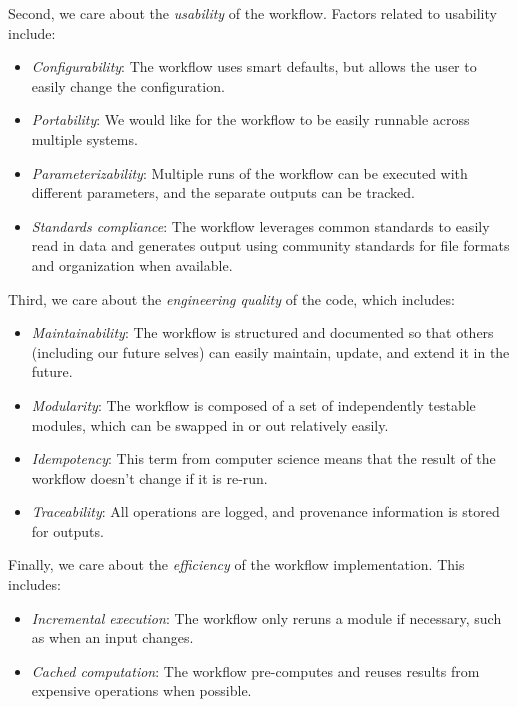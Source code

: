 Second, we care about the \textit{usability} of the workflow. Factors related to usability include:

\begin{itemize}
\item \textit{Configurability}: The workflow uses smart defaults, but allows the user to easily change the configuration.
\item \textit{Portability}: We would like for the workflow to be easily runnable across multiple systems.
\item \textit{Parameterizability}: Multiple runs of the workflow can be executed with different parameters, and the separate outputs can be tracked.
\item \textit{Standards compliance}:  The workflow leverages common standards to easily read in data and generates output using community standards for file formats and organization when available.
\end{itemize}

Third, we care about the \textit{engineering quality} of the code, which includes:

\begin{itemize}
\item \textit{Maintainability}: The workflow is structured and documented so that others (including our future selves) can easily maintain, update, and extend it in the future.
\item \textit{Modularity}: The workflow is composed of a set of independently testable modules, which can be swapped in or out relatively easily.
\item \textit{Idempotency}: This term from computer science means that the result of the workflow doesn't change if it is re-run.
\item \textit{Traceability}:  All operations are logged, and provenance information is stored for outputs.
\end{itemize}

Finally, we care about the \textit{efficiency} of the workflow implementation. This includes:

\begin{itemize}
\item \textit{Incremental execution}: The workflow only reruns a module if necessary, such as when an input changes.
\item \textit{Cached computation}: The workflow pre-computes and reuses results from expensive operations when possible.
\end{itemize}

